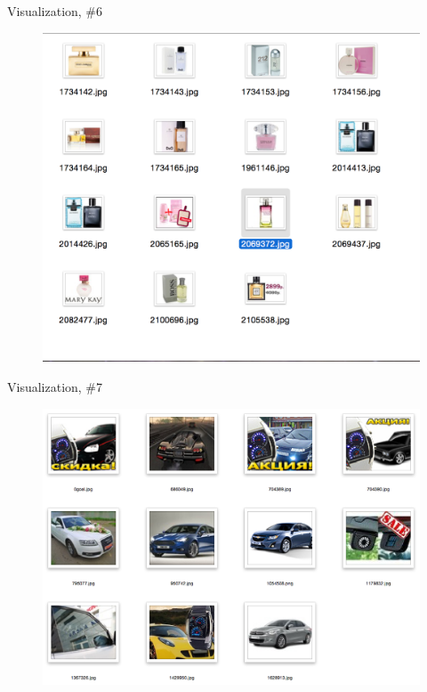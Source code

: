 \documentclass{beamer}
\begin{document}
\begin{frame}{Visualization, \#6}

\begin{figure}[h!]
  \centering
  \includegraphics[width=1\textwidth]{images/search6.png}
\end{figure}

\end{frame}


\begin{frame}{Visualization, \#7}

\begin{figure}[h!]
  \centering
  \includegraphics[width=1\textwidth]{images/search7.png}
\end{figure}

\end{frame}
\end{document}
